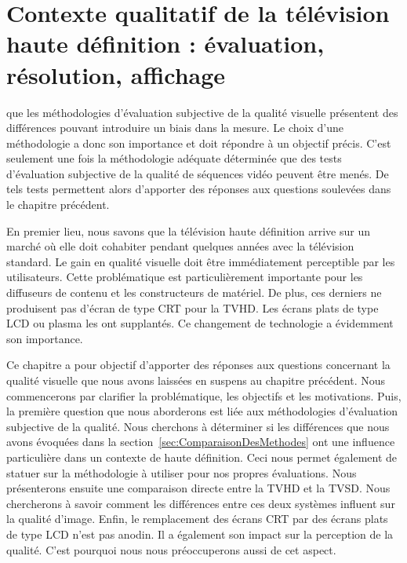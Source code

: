 \chapter{Contexte qualitatif de la télévision haute définition : évaluation, résolution, affichage} \label{chap:QoEinTVHD}
 que les méthodologies d'évaluation subjective de la qualité visuelle présentent des différences pouvant introduire un biais dans la mesure. Le choix d'une méthodologie a donc son importance et doit répondre à un objectif précis. C'est seulement une fois la méthodologie adéquate déterminée que des tests d'évaluation subjective de la qualité de séquences vidéo peuvent être menés. De tels tests permettent alors d'apporter des réponses aux questions soulevées dans le chapitre précédent.

En premier lieu, nous savons que la télévision haute définition arrive sur un marché où elle doit cohabiter pendant quelques années avec la télévision standard. Le gain en qualité visuelle doit être immédiatement perceptible par les utilisateurs. Cette problématique est particulièrement importante pour les diffuseurs de contenu et les constructeurs de matériel. De plus, ces derniers ne produisent pas d'écran de type CRT pour la TVHD. Les écrans plats de type LCD ou plasma les ont supplantés. Ce changement de technologie a évidemment son importance.

Ce chapitre a pour objectif d'apporter des réponses aux questions concernant la qualité visuelle que nous avons laissées en suspens au chapitre précédent. Nous commencerons par clarifier la problématique, les objectifs et les motivations. Puis, la première question que nous aborderons est liée aux méthodologies d'évaluation subjective de la qualité. Nous cherchons à déterminer si les différences que nous avons évoquées dans la section~\ref{sec:ComparaisonDesMethodes} ont une influence particulière dans un contexte de haute définition. Ceci nous permet également de statuer sur la méthodologie à utiliser pour nos propres évaluations. Nous présenterons ensuite une comparaison directe entre la TVHD et la TVSD. Nous chercherons à savoir comment les différences entre ces deux systèmes influent sur la qualité d'image. Enfin, le remplacement des écrans CRT par des écrans plats de type LCD n'est pas anodin. Il a également son impact sur la perception de la qualité. C'est pourquoi nous nous préoccuperons aussi de cet aspect.


